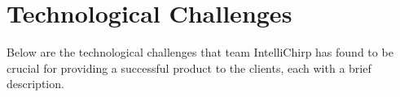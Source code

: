 \documentclass[12pt,journal,compsoc]{IEEEtran}
\begin{document}
%
%



\section{Technological Challenges}
Below are the technological challenges that team IntelliChirp has found to be crucial for providing a successful product to the clients, each with a brief description.
\end{document}
